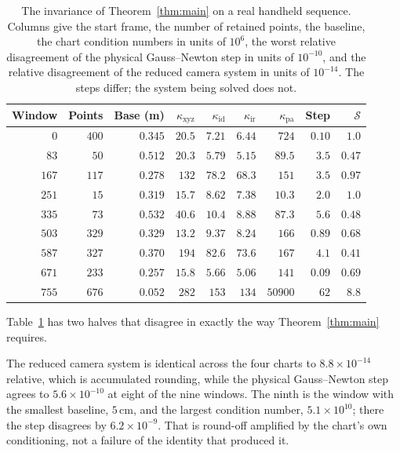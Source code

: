 \documentclass[11pt,a4paper]{article}
\theoremstyle{definition}
\theoremstyle{remark}
\begin{document}
\begin{table}[!tb]
\centering
\caption{The invariance of Theorem~\ref{thm:main} on a real handheld sequence. Columns give the start frame, the number of retained points, the baseline, the chart condition numbers in units of $10^{6}$, the worst relative disagreement of the physical Gauss--Newton step in units of $10^{-10}$, and the relative disagreement of the reduced camera system in units of $10^{-14}$. The steps differ; the system being solved does not.}
\label{tab:real}
\small
\setlength{\tabcolsep}{4.4pt}
\begin{tabular}{rrrrrrrrr}
\toprule
Window & Points & Base (m) & $\kappa_{\mathrm{xyz}}$ & $\kappa_{\mathrm{id}}$ & $\kappa_{\mathrm{ir}}$ & $\kappa_{\mathrm{pa}}$ & Step & $\mathcal S$\\
\midrule
$0$   & $400$ & $0.345$ & $20.5$ & $7.21$ & $6.44$ & $724$   & $0.10$ & $1.0$\\
$83$  & $50$  & $0.512$ & $20.3$ & $5.79$ & $5.15$ & $89.5$  & $3.5$  & $0.47$\\
$167$ & $117$ & $0.278$ & $132$  & $78.2$ & $68.3$ & $151$   & $3.5$  & $0.97$\\
$251$ & $15$  & $0.319$ & $15.7$ & $8.62$ & $7.38$ & $10.3$  & $2.0$  & $1.0$\\
$335$ & $73$  & $0.532$ & $40.6$ & $10.4$ & $8.88$ & $87.3$  & $5.6$  & $0.48$\\
$503$ & $329$ & $0.329$ & $13.2$ & $9.37$ & $8.24$ & $166$   & $0.89$ & $0.68$\\
$587$ & $327$ & $0.370$ & $194$  & $82.6$ & $73.6$ & $167$   & $4.1$  & $0.41$\\
$671$ & $233$ & $0.257$ & $15.8$ & $5.66$ & $5.06$ & $141$   & $0.09$ & $0.69$\\
$755$ & $676$ & $0.052$ & $282$  & $153$  & $134$  & $50900$ & $62$   & $8.8$\\
\bottomrule
\end{tabular}
\end{table}

Table~\ref{tab:real} has two halves that disagree in exactly the way Theorem~\ref{thm:main} requires.

The reduced camera system is identical across the four charts to $8.8\times10^{-14}$ relative, which is accumulated rounding, while the physical Gauss--Newton step agrees to $5.6\times10^{-10}$ at eight of the nine windows. The ninth is the window with the smallest baseline, $5$\,cm, and the largest condition number, $5.1\times10^{10}$; there the step disagrees by $6.2\times10^{-9}$. That is round-off amplified by the chart's own conditioning, not a failure of the identity that produced it.
\end{document}
